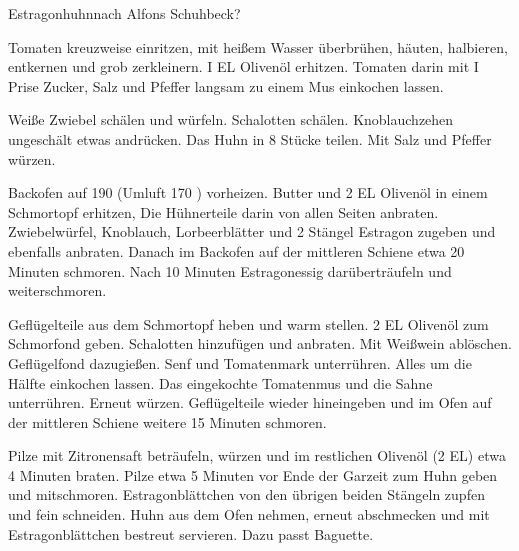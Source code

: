 \begin{recipe}{Estragonhuhn}{nach Alfons Schuhbeck?}
  \label{Estragonhuhn}
  \inglist

  \steps
  Tomaten kreuzweise einritzen, mit heißem Wasser überbrühen, häuten,
  halbieren, entkernen und grob zerkleinern. I EL Olivenöl erhitzen. Tomaten
  darin mit I Prise Zucker, Salz und Pfeffer langsam zu einem Mus einkochen
  lassen.

  Weiße Zwiebel schälen und würfeln. Schalotten schälen.  Knoblauchzehen
  ungeschält etwas andrücken. Das Huhn in 8 Stücke teilen. Mit Salz und Pfeffer
  würzen.

  Backofen auf 190 \celsius (Umluft 170 \celsius) vorheizen. Butter und 2 EL
  Olivenöl in einem Schmortopf erhitzen, Die Hühnerteile darin von allen Seiten
  anbraten.  Zwiebelwürfel, Knoblauch, Lorbeerblätter und 2 Stängel Estragon
  zugeben und ebenfalls anbraten. Danach im Backofen auf der mittleren Schiene
  etwa 20 Minuten schmoren. Nach 10 Minuten Estragonessig darüberträufeln und
  weiterschmoren.

  Geflügelteile aus dem Schmortopf heben und warm stellen. 2 EL Olivenöl zum
  Schmorfond geben. Schalotten hinzufügen und anbraten. Mit Weißwein ablöschen.
  Geflügelfond dazugießen. Senf und Tomatenmark unterrühren. Alles um die
  Hälfte einkochen lassen. Das eingekochte Tomatenmus und die Sahne
  unterrühren. Erneut würzen. Geflügelteile wieder hineingeben und im Ofen auf
  der mittleren Schiene weitere 15 Minuten schmoren.

  Pilze mit Zitronensaft beträufeln, würzen und im restlichen Olivenöl (2 EL)
  etwa 4 Minuten braten.  Pilze etwa 5 Minuten vor Ende der Garzeit zum Huhn
  geben und mitschmoren.  Estragonblättchen von den übrigen beiden Stängeln
  zupfen und fein schneiden.  Huhn aus dem Ofen nehmen, erneut abschmecken und
  mit Estragonblättchen bestreut servieren. Dazu passt Baguette.

\end{recipe}
